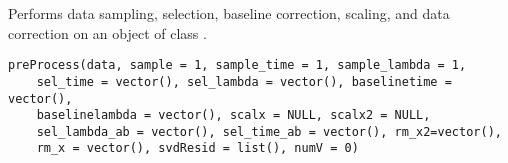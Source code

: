 \begin{Description}\relax
Performs data sampling, selection, baseline correction,  
scaling, and data correction on an object of class .
\end{Description}
\begin{Usage}
\begin{verbatim}
preProcess(data, sample = 1, sample_time = 1, sample_lambda = 1, 
    sel_time = vector(), sel_lambda = vector(), baselinetime = vector(), 
    baselinelambda = vector(), scalx = NULL, scalx2 = NULL, 
    sel_lambda_ab = vector(), sel_time_ab = vector(), rm_x2=vector(), 
    rm_x = vector(), svdResid = list(), numV = 0)
\end{verbatim}
\end{Usage}
